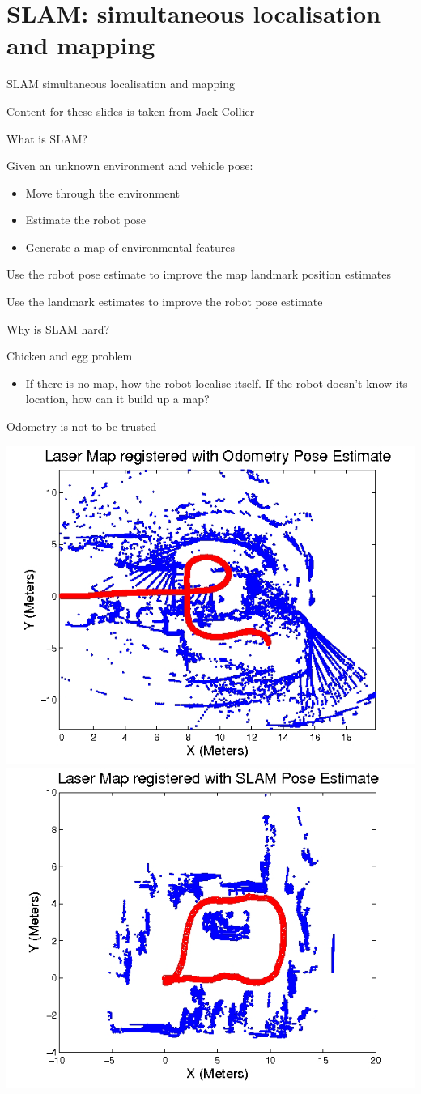 \documentclass[compress]{beamer}
\begin{document}
\section{SLAM: simultaneous localisation and mapping}

\begin{frame}{SLAM simultaneous localisation and mapping}

Content for these slides is taken from
\href{http://www.computerrobotvision.org/2010/slam_camp.html}{Jack
Collier}

\end{frame}

\begin{frame}{What is SLAM?}

Given an unknown environment and vehicle pose:

\begin{itemize}
\item Move through the environment
\item Estimate the robot pose
\item Generate a map of environmental features
\end{itemize}

Use the robot pose estimate to improve the map landmark position
estimates

Use the landmark estimates to improve the robot pose estimate

\end{frame}

\begin{frame}{Why is SLAM hard?}

Chicken and egg problem

\begin{itemize}
\item If there is no map, how the robot localise itself. If the robot
  doesn't know its location, how can it build up a map?
\end{itemize}

Odometry is not to be trusted

    \begin{center}
        \includegraphics[width=0.4\linewidth]{slam1}
        \hspace{1em}
        \includegraphics[width=0.4\linewidth]{slam2}
    \end{center}
\end{frame}
\end{document}
